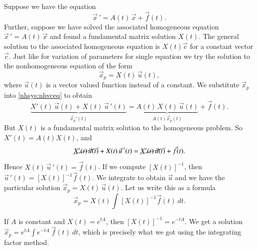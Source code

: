 \documentclass[12pt]{book}
\begin{document}
Suppose we have the equation
\begin{equation} \label{nhsys:nhvceq}
{\vec{x}\,}' = A(t) \, \vec{x} + \vec{f}(t) .
\end{equation}
Further, suppose we have solved the associated homogeneous equation
${\vec{x}\,}' = A(t) \, \vec{x}$ and found
a fundamental matrix solution
$X(t)$.  The general solution to the associated homogeneous equation
is $X(t) \vec{c}$ for a constant vector $\vec{c}$.  Just like for
variation of parameters for single equation we try the solution
to the nonhomogeneous equation of the form
\begin{equation*}
\vec{x}_p = X(t)\, \vec{u}(t) ,
\end{equation*}
where $\vec{u}(t)$ is a vector valued function instead of a constant.
We substitute $\vec{x}_p$ into \eqref{nhsys:nhvceq} to obtain
\begin{equation*}
\underbrace{X'(t)\, \vec{u}(t) + X(t)\, {\vec{u}\,}'(t)}%
_{{\vec{x}_p{}\!}'(t)}
=
\underbrace{A(t)\, X(t)\, \vec{u}(t)}%
_{A(t) \vec{x}_p (t)} 
 + \vec{f}(t) .
\end{equation*}
But $X(t)$ is a fundamental matrix solution to the homogeneous problem.
So $X'(t) = A(t)X(t)$, and
\begin{equation*}
\cancel{X'(t)\, \vec{u}(t)} + X(t)\, {\vec{u}\,}'(t)
=
\cancel{X'(t)\, \vec{u}(t)} + \vec{f}(t) .
\end{equation*}
Hence
$X(t)\, {\vec{u}\,}'(t) = \vec{f}(t)$.  If we compute
$\left[X(t)\right]^{-1}$,
then
${\vec{u}\,}'(t) = \left[X(t)\right]^{-1}\vec{f}(t)$.  We integrate
to obtain $\vec{u}$ and we have the particular solution
$\vec{x}_p = X(t)\, \vec{u}(t)$.
Let us write this as a formula
\begin{equation*}
\boxed{~~
\vec{x}_p = 
X(t)
\int \left[X(t)\right]^{-1}\vec{f}(t) ~ dt .
~~}
\end{equation*}

If $A$ is constant and $X(t) = e^{tA}$, then
$\left[X(t)\right]^{-1} = e^{-tA}$.  
We get a solution
$\vec{x}_p = 
e^{tA}
\int e^{-tA}\,\vec{f}(t) ~ dt$,
which is precisely what we got using the integrating factor method.
\end{document}

